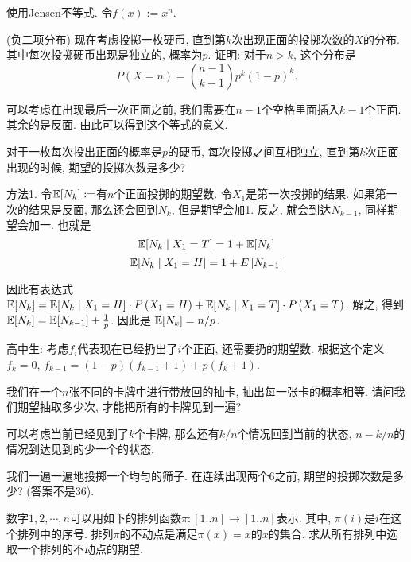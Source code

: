 \begin{solution*}
    使用Jensen不等式. 令$f(x):=x^n$. 
\end{solution*}

\begin{exercise}
    (负二项分布) 现在考虑投掷一枚硬币, 直到第$k$次出现正面的投掷次数的$X$的分布. 其中每次投掷硬币出现是独立的, 概率为$p$. 证明: 对于$n>k$, 这个分布是
    $$
    P(X=n) = \binom{n-1}{k-1}p^k(1-p)^k.
    $$
\end{exercise}

\begin{solution*}
    可以考虑在出现最后一次正面之前, 我们需要在$n-1$个空格里面插入$k-1$个正面. 其余的是反面. 由此可以得到这个等式的意义. 
\end{solution*}

\begin{exercise}
    对于一枚每次投出正面的概率是$p$的硬币, 每次投掷之间互相独立, 直到第$k$次正面出现的时候, 期望的投掷次数是多少? 
\end{exercise}

\begin{solution*}

    方法1. 令$\mathbb E[N_k]:=$有$n$个正面投掷的期望数. 令$X_1$是第一次投掷的结果. 如果第一次的结果是反面, 那么还会回到$N_k$, 但是期望会加1. 反之, 就会到达$N_{k-1}$, 同样期望会加一. 也就是
    $$
\mathbb E[N_k \mid X_1=T]=1+\mathbb E[N_k]
$$
$$
\mathbb E[N_k \mid X_1=H]=1+E\left[N_{k-1}\right]
$$

因此有表达式$\mathbb E[N_k]=\mathbb E[N_k \mid X_1=H] \cdot P\left(X_1=H\right)+\mathbb E[N_k \mid X_1=T] \cdot P\left(X_1=T\right)$. 解之, 得到$\mathbb E[N_k]=\mathbb E[N_{k-1}]+\frac{1}{p}$. 因此是 $\mathbb E[N_k]=n/p$.

    高中生: 考虑$f_i$代表现在已经扔出了$i$个正面, 还需要扔的期望数. 根据这个定义$f_k=0$, $f_{k-1}=(1-p)(f_{k-1}+1)+p(f_k+1)$. 

\end{solution*}


\begin{exercise}
    我们在一个$n$张不同的卡牌中进行带放回的抽卡, 抽出每一张卡的概率相等. 请问我们期望抽取多少次, 才能把所有的卡牌见到一遍? 
\end{exercise}

\begin{solution*}
    可以考虑当前已经见到了$k$个卡牌, 那么还有$k/n$个情况回到当前的状态, $n-k/n$的情况到达见到的少一个的状态. 
\end{solution*}

\begin{exercise}
    我们一遍一遍地投掷一个均匀的筛子. 在连续出现两个6之前, 期望的投掷次数是多少? (答案不是36).
\end{exercise}



\begin{exercise}
     数字$1,2,\cdots, n$可以用如下的排列函数$\pi:[1..n] \to [1..n]$表示. 其中, $\pi(i)$是$i$在这个排列中的序号. 排列$\pi$的不动点是满足$\pi(x)=x$的$x$的集合. 求从所有排列中选取一个排列的不动点的期望. 
\end{exercise}


